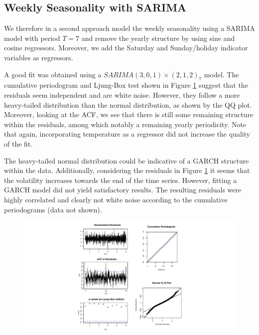 \documentclass[conference]{IEEEtran}
\begin{document}
\subsection{Weekly Seasonality with SARIMA}
We therefore in a second approach model the weekly seasonality using a SARIMA model with period $T=7$ and remove the yearly structure by using sine and cosine regressors. Moreover, we add the Saturday and Sunday/holiday indicator variables as regressors. 
\par
A good fit was obtained using a $SARIMA(3, 0, 1)\times(2, 1, 2)_{7}$ model. The cumulative periodogram and Ljung-Box test shown in Figure \ref{daily_sarima} suggest that the residuals seem independent and are white noise. However, they follow a more heavy-tailed distribution than the normal distribution, as shown by the QQ plot. Moreover, looking at the ACF, we see that there is still some remaining structure within the residuals, among which notably a remaining yearly periodicity. Note that again, incorporating temperature as a regressor did not increase the quality of the fit.
\par
The heavy-tailed normal distribution could be indicative of a GARCH structure within the data. Additionally, considering the residuals in Figure \ref{daily_sarima} it seems that the volatility increases towards the end of the time series. However, fitting a GARCH model did not yield satisfactory results. The resulting residuals were highly correlated and clearly not white noise according to the cumulative periodograms (data not shown).

\begin{figure}[ht]
	\centering
	\includegraphics[width=1\textwidth]{Figs/Fig6.pdf}
	\caption{}
	\label{daily_sarima}
\end{figure}
\end{document}
